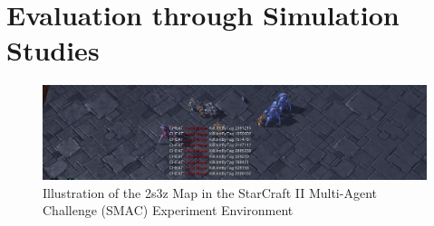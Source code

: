 \documentclass[letterpaper]{article} %
\begin{document}
\section{Evaluation through Simulation Studies}

\begin{figure}[hptb]
\centering
\includegraphics[width=\textwidth]{./figures/smac.png}
\caption{Illustration of the 2s3z Map in the StarCraft II Multi-Agent Challenge (SMAC) Experiment Environment}
\label{fig:smac}
\end{figure}
\end{document}
